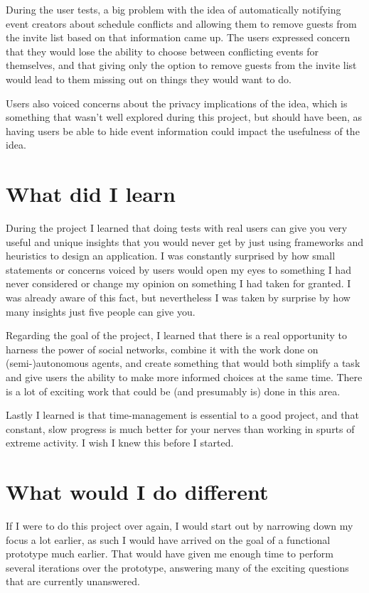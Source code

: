 \documentclass[a4paper,11pt]{report}
\begin{document}
During the user tests, a big problem with the idea of automatically notifying
event creators about schedule conflicts and allowing them to remove guests from
the invite list based on that information came up. The users expressed concern
that they would lose the ability to choose between conflicting events for
themselves, and that giving only the option to remove guests from the invite
list would lead to them missing out on things they would want to do.

Users also voiced concerns about the privacy implications of the idea, which is
something that wasn't well explored during this project, but should have been,
as having users be able to hide event information could impact the usefulness of
the idea.

\section{What did I learn}

During the project I learned that doing tests with real users can give you very
useful and unique insights that you would never get by just using frameworks and
heuristics to design an application. I was constantly surprised by how small
statements or concerns voiced by users would open my eyes to something I had
never considered or change my opinion on something I had taken for granted. I
was already aware of this fact, but nevertheless I was taken by surprise by how
many insights just five people can give you.

Regarding the goal of the project, I learned that there is a real opportunity to
harness the power of social networks, combine it with the work done on
(semi-)autonomous agents, and create something that would both simplify a task
and give users the ability to make more informed choices at the same time. There
is a lot of exciting work that could be (and presumably is) done in this area.

Lastly I learned is that time-management is essential to a good project, and
that constant, slow progress is much better for your nerves than working in
spurts of extreme activity. I wish I knew this before I started.

\section{What would I do different}

If I were to do this project over again, I would start out by narrowing down my
focus a lot earlier, as such I would have arrived on the goal of a functional
prototype much earlier. That would have given me enough time to perform several
iterations over the prototype, answering many of the exciting questions that are
currently unanswered.
\end{document}
